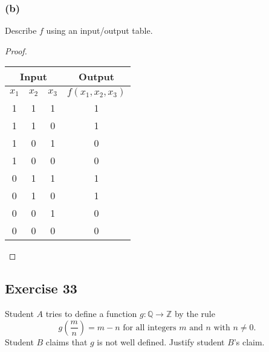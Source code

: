 \documentclass[14pt]{extarticle}
\newcommand{\Q}{\mathbb{Q}}
\newcommand{\Z}{\mathbb{Z}}
\newcommand{\cy}{\color{cyan}}
\begin{document}
\subsubsection{(b)}
Describe $f$ using an input/output table.

\begin{proof}
    \begin{center}
        \begin{tabular}{|ccc|c|}
            \hline
            \multicolumn{3}{|c|}{\cy Input} & {\cy Output}                              \\
            \hline
            $x_1$                           & $x_2$        & $x_3$ & $f(x_1, x_2, x_3)$ \\
            \hline
            1                               & 1            & 1     & 1                  \\
            \hline
            1                               & 1            & 0     & 1                  \\
            \hline
            1                               & 0            & 1     & 0                  \\
            \hline
            1                               & 0            & 0     & 0                  \\
            \hline
            0                               & 1            & 1     & 1                  \\
            \hline
            0                               & 1            & 0     & 1                  \\
            \hline
            0                               & 0            & 1     & 0                  \\
            \hline
            0                               & 0            & 0     & 0                  \\
            \hline
        \end{tabular}
    \end{center}
\end{proof}

\subsection{Exercise 33}
Student $A$ tries to define a function \(g: \Q \to \Z\) by
the rule
\[
    g \left(\frac{m}{n}\right) = m-n \text{ for all integers } m \text{ and } n \text{ with } n \neq 0.
\]
Student $B$ claims that $g$ is not well defined. Justify student $B$'s claim.
\end{document}
